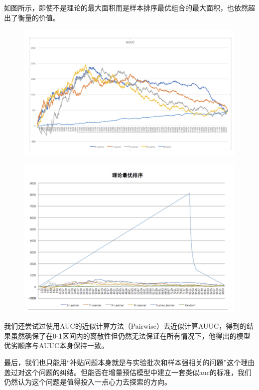\documentclass[12pt]{article}
\begin{document}
如图所示，即使不是理论的最大面积而是样本排序最优组合的最大面积，也依然超出了衡量的价值。
\begin{figure}[H]
    \centering
    \includegraphics[width=.8\textwidth]{fig/Casual_Inference_In_Didi_23.png}
\end{figure}
\begin{figure}[H]
    \centering
    \includegraphics[width=.8\textwidth]{fig/Casual_Inference_In_Didi_24.png}
\end{figure}
我们还尝试过使用AUC的近似计算方法（Pairwise）去近似计算AUUC，得到的结果虽然确保了在0-1区间内的离散性但仍然无法保证在所有情况下，他得出的模型优劣顺序与AUUC本身保持一致。

最后，我们也只能用“补贴问题本身就是与实验批次和样本强相关的问题”这个理由盖过对这个问题的纠结。但能否在增量预估模型中建立一套类似auc的标准，我们仍然认为这个问题是值得投入一点心力去探索的方向。 



\end{document}
